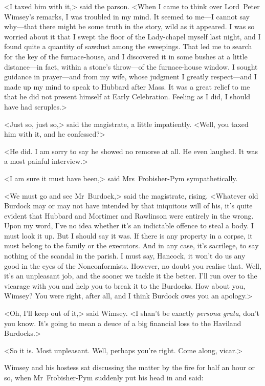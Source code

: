 <I taxed him with it,> said the parson. <When I came to think over Lord~Peter Wimsey's remarks, I was troubled in my mind. It seemed to me—I cannot say why—that there might be some truth in the story, wild as it appeared. I was so worried about it that I swept the floor of the Lady-chapel myself last night, and I found quite a quantity of sawdust among the sweepings. That led me to search for the key of the furnace-house, and I discovered it in some bushes at a little distance—in fact, within a stone's throw—of the furnace-house window. I sought guidance in prayer—and from my wife, whose judgment I greatly respect—and I made up my mind to speak to Hubbard after Mass. It was a great relief to me that he did not present himself at Early Celebration. Feeling as I did, I should have had scruples.>

<Just so, just so,> said the magistrate, a little impatiently. <Well, you taxed him with it, and he confessed?>

<He did. I am sorry to say he showed no remorse at all. He even laughed. It was a most painful interview.>

<I am sure it must have been,> said Mrs~Frobisher-Pym sympathetically.

<We must go and see Mr~Burdock,> said the magistrate, rising. <Whatever old Burdock may or may not have intended by that iniquitous will of his, it's quite evident that Hubbard and Mortimer and Rawlinson were entirely in the wrong. Upon my word, I've no idea whether it's an indictable offence to steal a body. I must look it up. But I should say it was. If there is any property in a corpse, it must belong to the family or the executors. And in any case, it's sacrilege, to say nothing of the scandal in the parish. I must say, Hancock, it won't do us any good in the eyes of the Nonconformists. However, no doubt you realise that. Well, it's an unpleasant job, and the sooner we tackle it the better. I'll run over to the vicarage with you and help you to break it to the Burdocks. How about you, Wimsey? You were right, after all, and I think Burdock owes you an apology.>

<Oh, I'll keep out of it,> said Wimsey. <I shan't be exactly \textit{persona grata}, don't you know. It's going to mean a deuce of a big financial loss to the Haviland Burdocks.>

<So it is. Most unpleasant. Well, perhaps you're right. Come along, vicar.>

Wimsey and his hostess sat discussing the matter by the fire for half an hour or so, when Mr~Frobisher-Pym suddenly put his head in and said:


